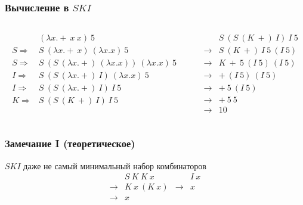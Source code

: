 \documentclass[aspectratio=169]{beamer}
\begin{document}
\begin{frame}
    \frametitle{Вычисление в $SKI$}

    \begin{columns}
        \begin{column}{0.5\textwidth}
            \begin{align*}
                                & (\lambda x.+\ x\ x)\ 5                                 \\
                S \Rightarrow{} & S\ (\lambda x.+\ x)\ (\lambda x.x)\ 5                  \\
                S \Rightarrow{} & S\ (S\ (\lambda x.+)\ (\lambda x.x))\ (\lambda x.x)\ 5 \\
                I \Rightarrow{} & S\ (S\ (\lambda x.+)\ I)\ (\lambda x.x)\ 5             \\
                I \Rightarrow{} & S\ (S\ (\lambda x.+)\ I)\ I\ 5                         \\
                K \Rightarrow{} & S\ (S\ (K\ +)\ I)\ I\ 5
            \end{align*}
        \end{column}
        \begin{column}{0.5\textwidth}
            \begin{align*}
                              & S\ (S\ (K\ +)\ I)\ I\ 5 \\
                \rightarrow{} & S\ (K\ +)\ I\ 5\ (I\ 5) \\
                \rightarrow{} & K\ +\ 5\ (I\ 5)\ (I\ 5) \\
                \rightarrow{} & +\ (I\ 5)\ (I\ 5)       \\
                \rightarrow{} & +\ 5\ (I\ 5)            \\
                \rightarrow{} & +\ 5\ 5                 \\
                \rightarrow{} & 10
            \end{align*}
        \end{column}
    \end{columns}

\end{frame}

\begin{frame}
    \frametitle{Замечание I (теоретическое)}

    $SKI$ даже не самый минимальный набор комбинаторов
    \begin{align*}
                      & S\ K\ K\ x   &               & I\ x \\
        \rightarrow{} & K\ x\ (K\ x) & \rightarrow{} & x    \\
        \rightarrow{} & x            &               &
    \end{align*}

\end{frame}
\end{document}
